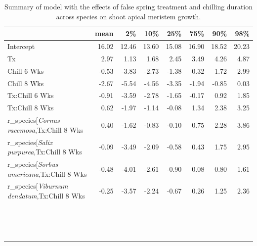 \documentclass{article}\usepackage[]{graphicx}\usepackage[]{color}
\begin{document}
\begin{longtable}{lrrrrrrr}
\caption{Summary of model with the effects of false spring treatment and chilling duration across species on shoot apical meristem growth.} \\ 
  \hline
 & mean & 2\% & 10\% & 25\% & 75\% & 90\% & 98\% \\ 
  \hline \endhead  \hline
Intercept & 16.02 & 12.46 & 13.60 & 15.08 & 16.90 & 18.52 & 20.23 \\ 
  Tx & 2.97 & 1.13 & 1.68 & 2.45 & 3.49 & 4.26 & 4.87 \\ 
  Chill 6 Wks & -0.53 & -3.83 & -2.73 & -1.38 & 0.32 & 1.72 & 2.99 \\ 
  Chill 8 Wks & -2.67 & -5.54 & -4.56 & -3.35 & -1.94 & -0.85 & 0.03 \\ 
  Tx:Chill 6 Wks & -0.91 & -3.59 & -2.78 & -1.65 & -0.17 & 0.92 & 1.85 \\ 
  Tx:Chill 8 Wks & 0.62 & -1.97 & -1.14 & -0.08 & 1.34 & 2.38 & 3.25 \\ 
  r_species[\textit{Cornus racemosa},Tx:Chill 8 Wks & 0.40 & -1.62 & -0.83 & -0.10 & 0.75 & 2.28 & 3.86 \\ 
  r_species[\textit{Salix purpurea},Tx:Chill 8 Wks & -0.09 & -3.49 & -2.09 & -0.58 & 0.43 & 1.75 & 2.95 \\ 
  r_species[\textit{Sorbus americana},Tx:Chill 8 Wks & -0.48 & -4.01 & -2.61 & -0.90 & 0.08 & 0.80 & 1.61 \\ 
  r_species[\textit{Viburnum dendatum},Tx:Chill 8 Wks & -0.25 & -3.57 & -2.24 & -0.67 & 0.26 & 1.25 & 2.36 \\ 
   &  &  &  &  &  &  &  \\ 
   &  &  &  &  &  &  &  \\ 
   &  &  &  &  &  &  &  \\ 
   &  &  &  &  &  &  &  \\ 
   &  &  &  &  &  &  &  \\ 
   &  &  &  &  &  &  &  \\ 
   &  &  &  &  &  &  &  \\ 
   &  &  &  &  &  &  &  \\ 
   &  &  &  &  &  &  &  \\ 
   &  &  &  &  &  &  &  \\ 
   &  &  &  &  &  &  &  \\ 
   &  &  &  &  &  &  &  \\ 
   &  &  &  &  &  &  &  \\ 
   &  &  &  &  &  &  &  \\ 
   &  &  &  &  &  &  &  \\ 

\end{longtable}
\end{document}
